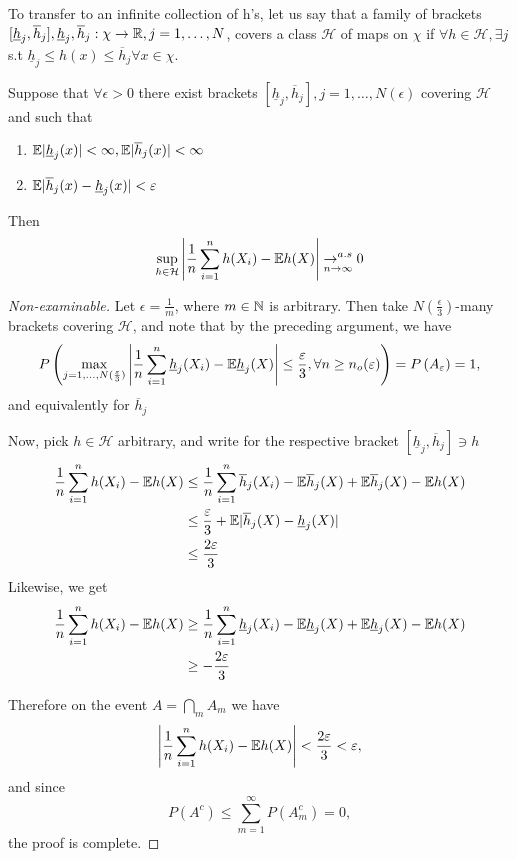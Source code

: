 \documentclass[a4paper]{article}
\begin{document}
To transfer to an infinite collection of h's, let us say that a family of brackets $[\underline{h}_j, \overline{h}_j], \underline{h}_j, \overline{h}_j : \chi \to \mathbb{R}, j=1,\ldots,N$, covers a class $\mathcal{H}$ of maps on $\chi$ if  $\forall h \in  \mathcal{H}, \exists j$ s.t $\underline{h}_j \le h(x) \le \overline{h}_j \forall x \in \chi$.

\begin{prop}
	Suppose that $\forall \epsilon > 0$ there exist brackets $[\underline{h}_j, \overline{h}_j], j=1,\ldots,N(\epsilon)$ covering $\mathcal{H}$ and such that
	\begin{enumerate}
		\item $\mathbb{E} |\underline{h}_j(x) | < \infty, \mathbb{E}|\overline{h}_j(x)| < \infty$
		\item $\mathbb{E} |\overline{h}_j(x) - \underline{h}_j(x)| < \varepsilon$
	\end{enumerate}
	Then
	\[
		\sup_{h \in \mathcal{H}} \left| \frac{1}{n} \sum_{i=1}^{n} h(X_i) - \mathbb{E} h(X) \right| \underset{n \to \infty}{\to^{a.s} } 0
	\] 
\end{prop}

\begin{proof}[Non-examinable]
	Let $\epsilon = \frac{1}{m}$, where $m \in \mathbb{N}$ is arbitrary. Then take $N(\frac{\epsilon}{3})$-many brackets covering $\mathcal{H}$, and note that by the preceding argument, we have
	\[
		P\left( \max_{j=1,\ldots,N(\frac{\varepsilon}{3})} \left| \frac{1}{n}\sum_{i=1}^{n} \underline{h}_j (X_i) - \mathbb{E} \underline{h}_j (X) \right| \le  \frac{\varepsilon}{3}, \forall n \ge n_o (\varepsilon) \right) = P\left( A_{\varepsilon} \right) = 1
	,\] and equivalently for $\overline{h}_j$

	Now, pick $h \in  \mathcal{H}$ arbitrary, and write for the respective bracket $[\underline{h}_j, \overline{h}_j] \ni h$ 
	\begin{align*}
		\frac{1}{n} \sum_{i=1}^{n}h(X_i) - \mathbb{E} h(X) &\le \frac{1}{n}\sum_{i=1}^{n} \overline{h}_j(X_i) - \mathbb{E} \overline{h}_j(X) + \mathbb{E} \overline{h}_j (X) - \mathbb{E} h(X) \\
		&\le \frac{\varepsilon}{3} + \mathbb{E} |\overline{h}_j(X) - \underline{h}_j (X) |  \\
		&\le \frac{2\varepsilon}{3}
	\end{align*}
	Likewise, we get
	\begin{align*}
		\frac{1}{n} \sum_{i=1}^{n}h(X_i) - \mathbb{E} h(X) &\ge \frac{1}{n}\sum_{i=1}^{n} \underline{h}_j(X_i) - \mathbb{E} \underline{h}_j(X) + \mathbb{E} \underline{h}_j (X) - \mathbb{E} h(X) \\
		&\ge - \frac{2\varepsilon}{3}
	\end{align*}

	Therefore on the event $A = \bigcap_{m} A_m $ we have
	\[
		\left| \frac{1}{n} \sum_{i=1}^{n} h(X_i) - \mathbb{E} h(X) \right| < \frac{2\varepsilon}{3} < \varepsilon
	,\] and since
	\[
	P\left( A^{c} \right) \le \sum_{m=1}^{\infty} P\left( A_m^{c} \right) = 0
	,\] the proof is complete.
\end{proof}
\end{document}
